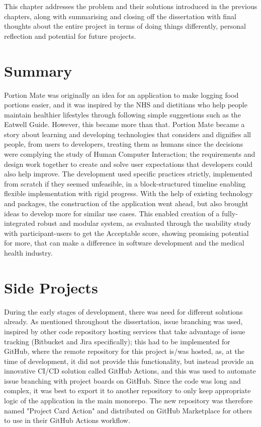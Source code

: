 \documentclass[../main.tex]{subfiles}
\begin{document}
This chapter addresses the problem and their solutions introduced in the previous chapters, along with summarising and closing off the dissertation with final thoughts about the entire project in terms of doing things differently, personal reflection and potential for future projects.

\section{Summary}

Portion Mate was originally an idea for an application to make logging food portions easier, and it was inspired by the NHS and dietitians who help people maintain healthier lifestyles through following simple suggestions such as the Eatwell Guide. However, this became more than that. Portion Mate became a story about learning and developing technologies that considers and dignifies all people, from users to developers, treating them as humans since the decisions were complying the study of Human Computer Interaction; the requirements and design work together to create and solve user expectations that developers could also help improve. The development used specific practices strictly, implemented from scratch if they seemed unfeasible, in a block-structured timeline enabling flexible implementation with rigid progress. With the help of existing technology and packages, the construction of the application went ahead, but also brought ideas to develop more for similar use cases. This enabled creation of a fully-integrated robust and modular system, as evaluated through the usability study with participant-users to get the Acceptable score, showing promising potential for more, that can make a difference in software development and the medical health industry.

\section{Side Projects}

During the early stages of development, there was need for different solutions already. As mentioned throughout the dissertation, issue branching was used, inspired by other code repository hosting services that take advantage of issue tracking (Bitbucket and Jira specifically); this had to be implemented for GitHub, where the remote repository for this project is/was hosted, as, at the time of development, it did not provide this functionality, but instead provide an innovative CI/CD solution called GitHub Actions, and this was used to automate issue branching with project boards on GitHub. Since the code was long and complex, it was best to export it to another repository to only keep appropriate logic of the application in the main monorepo. The new repository was therefore named "Project Card Action" and distributed on GitHub Marketplace for others to use in their GitHub Actions workflow.
\end{document}

